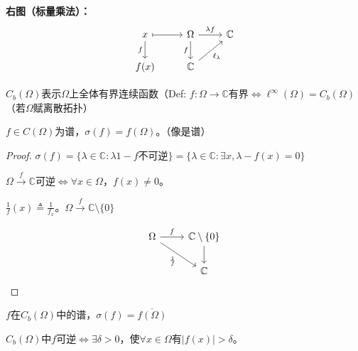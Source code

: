 \documentclass[lang=cn,a4paper,newtx,section]{elegantbook}
\begin{document}
\textbf{右图（标量乘法）：}
\begin{equation*}
  \begin{tikzcd}
    x \arrow[r, mapsto] \arrow[d, "f"'] & \Omega \arrow[r, "\lambda f"] \arrow[d, "f"'] & \mathbb{C} \\
    f(x) & \mathbb{C} \arrow[ur, "\ell_\lambda"'] &
  \end{tikzcd}
\end{equation*}
\begin{example}
    $C_b(\Omega)$表示$\Omega$上全体有界连续函数（Def: $f: \Omega \to \mathbb{C}$有界$\Longleftrightarrow \ell^\infty(\Omega) = C_b(\Omega)$（若$\Omega$赋离散拓扑）

\end{example}
\begin{example}
    $f \in C(\Omega)$为谱，$\sigma(f) = f(\Omega)$。（像是谱）

\end{example}

\begin{proof}
  $\sigma(f) = \{\lambda \in \mathbb{C} : \lambda 1 - f$不可逆$\} = \{\lambda \in \mathbb{C} : \exists x, \lambda - f(x) = 0\}$
  
  $\Omega \xrightarrow{f} \mathbb{C}$可逆$\Longleftrightarrow \forall x \in \Omega$，$f(x) \neq 0$。
  
  $\frac{1}{f}(x) \triangleq  \frac{1}{f_x}$。$\Omega \xrightarrow{f} \mathbb{C} \setminus \{0\}$
  
  \begin{equation*}
    \begin{tikzcd}
      \Omega \arrow[r, "f"] \arrow[dr, "\frac{1}{f}"'] & \mathbb{C} \setminus \{0\} \arrow[d] \\
      & \mathbb{C}
    \end{tikzcd}
  \end{equation*}
\end{proof}

$f $在$C_b(\Omega)$中的谱，$\sigma(f) = \overline{f(\Omega)}$

\begin{remark}
  $C_b(\Omega)$中$f$可逆$\Longleftrightarrow \exists \delta > 0$，使$\forall x \in \Omega$有$|f(x)| > \delta$。
\end{remark}
\end{document}
